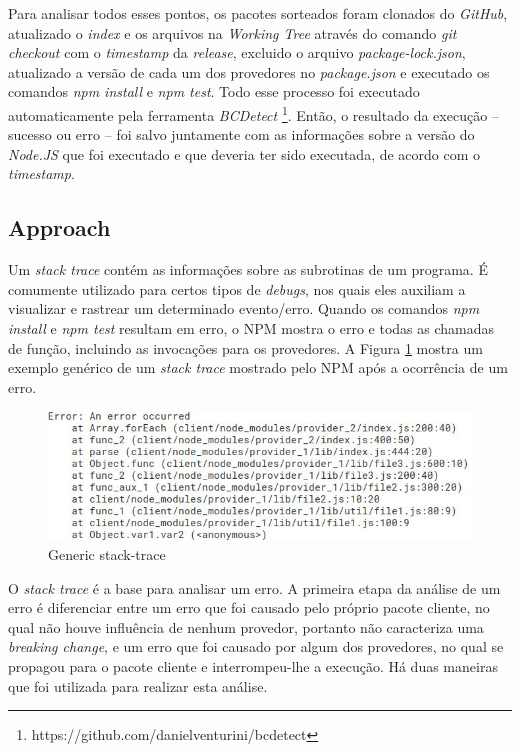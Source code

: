 Para analisar todos esses pontos, os pacotes sorteados foram clonados do \textit{GitHub}, atualizado o \textit{index} e os arquivos na \textit{Working Tree} através do comando \textit{git checkout} com o \textit{timestamp} da \textit{release}, excluido o arquivo \textit{package-lock.json}, atualizado a versão de cada um dos provedores no \textit{package.json} e executado os comandos \textit{npm install} e \textit{npm test}. Todo esse processo foi executado automaticamente pela ferramenta \textit{BCDetect} \footnote{https://github.com/danielventurini/bcdetect}. Então, o resultado da execução -- sucesso ou erro -- foi salvo juntamente com as informações sobre a versão do \textit{Node.JS} que foi executado e que deveria ter sido executada, de acordo com o \textit{timestamp}. %

\subsection{Approach}
\label{apr:rq1}
Um \textit{stack trace} contém as informações sobre as subrotinas de um programa. É comumente utilizado para certos tipos de \textit{debugs}, nos quais eles auxiliam a visualizar e rastrear um determinado evento/erro. Quando os comandos \textit{npm install} e \textit{npm test} resultam em erro, o \Gls{NPM} mostra o erro e todas as chamadas de função, incluindo as invocações para os provedores. A Figura \ref{fig:trace} mostra um exemplo genérico de um \textit{stack trace} mostrado pelo \Gls{NPM} após a ocorrência de um erro.

\begin{figure}
    \centering
    \includegraphics[scale=0.7]{figuras/stack_trace.jpeg}
    \caption{Generic stack-trace}
    \label{fig:trace}
\end{figure}{}

O \textit{stack trace} é a base para analisar um erro. A primeira etapa da análise de um erro é diferenciar entre um erro que foi causado pelo próprio pacote cliente, no qual não houve influência de nenhum provedor, portanto não caracteriza uma \textit{breaking change}, e um erro que foi causado por algum dos provedores, no qual se propagou para o pacote cliente e interrompeu-lhe a execução. Há duas maneiras que foi utilizada para realizar esta análise.

